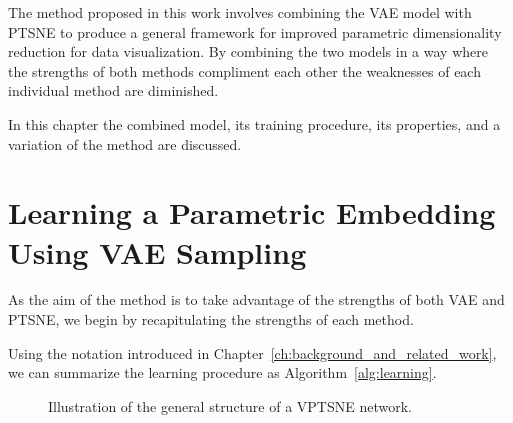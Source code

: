 The method proposed in this work involves combining the VAE model with PTSNE to produce a general framework for improved parametric dimensionality reduction for data visualization. By combining the two models in a way where the strengths of both methods compliment each other the weaknesses of each individual method are diminished.

In this chapter the combined model, its training procedure, its properties, and a variation of the method are discussed.

\section{Learning a Parametric Embedding Using VAE Sampling}

As the aim of the method is to take advantage of the strengths of both VAE and PTSNE, we begin by recapitulating the strengths of each method.


Using the notation introduced in Chapter~\ref{ch:background_and_related_work}, we can summarize the learning procedure as Algorithm~\ref{alg:learning}. 

\begin{figure}[!htb]
  \centering
  \resizebox{0.7\textwidth}{!}{\unskip}
  \caption{Illustration of the general structure of a VPTSNE network.}
  \label{fig:vptsne}
\end{figure}

